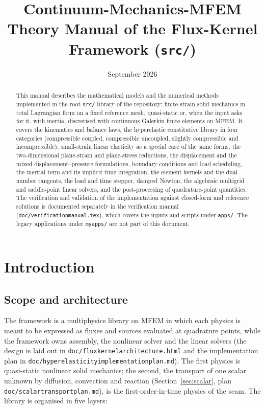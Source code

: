 \documentclass[11pt]{article}
\title{Continuum-Mechanics-MFEM\\[4pt]
\large Theory Manual of the Flux-Kernel Framework (\texttt{src/})}
\author{}
\date{September 2026}
\DeclareRobustCommand{\file}[1]{{\def\_{\textunderscore\allowbreak}\texttt{#1}}}
\begin{document}
\maketitle

\begin{abstract}
\noindent
This manual describes the mathematical models and the numerical methods
implemented in the root \file{src/} library of the repository: finite-strain
solid mechanics in total Lagrangian form on a fixed reference mesh,
quasi-static or, when the input asks for it, with inertia, discretised with
continuous Galerkin finite elements on MFEM.  It
covers the kinematics and balance laws, the hyperelastic constitutive
library in four categories (compressible coupled, compressible uncoupled,
slightly compressible and incompressible), small-strain linear elasticity as
a special case of the same forms, the two-dimensional plane-strain and
plane-stress reductions, the displacement and the mixed
displacement--pressure formulations, boundary conditions and load
scheduling, the inertial term and its implicit time integration, the element
kernels and the dual-number tangents, the load and time stepper, damped
Newton, the algebraic multigrid and saddle-point linear solvers, and the
post-processing of quadrature-point quantities.  The verification and validation of the implementation against
closed-form and reference solutions is documented separately in the
verification manual (\file{doc/verification\_manual.tex}), which covers the
inputs and scripts under \file{apps/}.  The legacy applications under
\file{myapps/} are not part of this document.
\end{abstract}

\tableofcontents

\section{Introduction}

\subsection{Scope and architecture}

The framework is a multiphysics library on MFEM in which each physics is
meant to be expressed as fluxes and sources evaluated at quadrature points,
while the framework owns assembly, the nonlinear solver and the linear
solvers (the design is laid out in \file{doc/flux\_kernel\_architecture.html}
and the implementation plan in
\file{doc/hyperelasticity\_implementation\_plan.md}).  The first physics
is quasi-static nonlinear solid mechanics; the second, the transport of one
scalar unknown by diffusion, convection and reaction
(Section~\ref{sec:scalar}, plan \file{doc/scalar\_transport\_plan.md}),
is the first-order-in-time physics of the seam.  The library is organised
in five layers:
\end{document}
